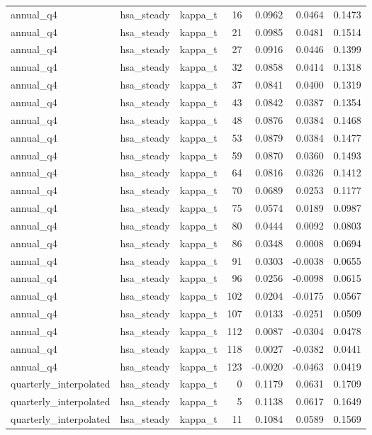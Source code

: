 \begin{tabular}{lllrrrr}
annual\_q4 & hsa\_steady & kappa\_t & 16 & 0.0962 & 0.0464 & 0.1473 \\
annual\_q4 & hsa\_steady & kappa\_t & 21 & 0.0985 & 0.0481 & 0.1514 \\
annual\_q4 & hsa\_steady & kappa\_t & 27 & 0.0916 & 0.0446 & 0.1399 \\
annual\_q4 & hsa\_steady & kappa\_t & 32 & 0.0858 & 0.0414 & 0.1318 \\
annual\_q4 & hsa\_steady & kappa\_t & 37 & 0.0841 & 0.0400 & 0.1319 \\
annual\_q4 & hsa\_steady & kappa\_t & 43 & 0.0842 & 0.0387 & 0.1354 \\
annual\_q4 & hsa\_steady & kappa\_t & 48 & 0.0876 & 0.0384 & 0.1468 \\
annual\_q4 & hsa\_steady & kappa\_t & 53 & 0.0879 & 0.0384 & 0.1477 \\
annual\_q4 & hsa\_steady & kappa\_t & 59 & 0.0870 & 0.0360 & 0.1493 \\
annual\_q4 & hsa\_steady & kappa\_t & 64 & 0.0816 & 0.0326 & 0.1412 \\
annual\_q4 & hsa\_steady & kappa\_t & 70 & 0.0689 & 0.0253 & 0.1177 \\
annual\_q4 & hsa\_steady & kappa\_t & 75 & 0.0574 & 0.0189 & 0.0987 \\
annual\_q4 & hsa\_steady & kappa\_t & 80 & 0.0444 & 0.0092 & 0.0803 \\
annual\_q4 & hsa\_steady & kappa\_t & 86 & 0.0348 & 0.0008 & 0.0694 \\
annual\_q4 & hsa\_steady & kappa\_t & 91 & 0.0303 & -0.0038 & 0.0655 \\
annual\_q4 & hsa\_steady & kappa\_t & 96 & 0.0256 & -0.0098 & 0.0615 \\
annual\_q4 & hsa\_steady & kappa\_t & 102 & 0.0204 & -0.0175 & 0.0567 \\
annual\_q4 & hsa\_steady & kappa\_t & 107 & 0.0133 & -0.0251 & 0.0509 \\
annual\_q4 & hsa\_steady & kappa\_t & 112 & 0.0087 & -0.0304 & 0.0478 \\
annual\_q4 & hsa\_steady & kappa\_t & 118 & 0.0027 & -0.0382 & 0.0441 \\
annual\_q4 & hsa\_steady & kappa\_t & 123 & -0.0020 & -0.0463 & 0.0419 \\
quarterly\_interpolated & hsa\_steady & kappa\_t & 0 & 0.1179 & 0.0631 & 0.1709 \\
quarterly\_interpolated & hsa\_steady & kappa\_t & 5 & 0.1138 & 0.0617 & 0.1649 \\
quarterly\_interpolated & hsa\_steady & kappa\_t & 11 & 0.1084 & 0.0589 & 0.1569 \\

\end{tabular}
